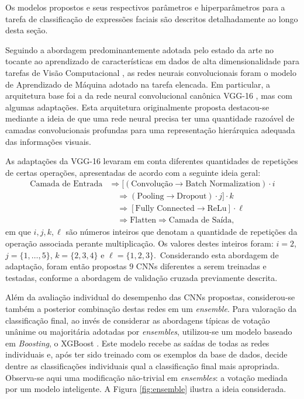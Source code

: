 Os modelos propostos e seus respectivos parâmetros e hiperparâmetros para a tarefa de classificação de expressões faciais são descritos detalhadamente ao longo desta seção.

Seguindo a abordagem predominantemente adotada pelo estado da arte no tocante ao aprendizado de características em dados de alta dimensionalidade para tarefas de Visão Computacional \cite{Khan:Livro}, as redes neurais convolucionais foram o modelo de Aprendizado de Máquina adotado na tarefa elencada. Em particular, a arquitetura base foi a da rede neural convolucional canônica VGG-16 \cite{VGG}, mas com algumas adaptações. Esta arquitetura originalmente proposta  destacou-se mediante a ideia de que uma rede neural precisa ter uma quantidade razoável  de camadas convolucionais profundas para uma representação hierárquica adequada das informações visuais.

As adaptações da VGG-16 levaram em conta diferentes quantidades de repetições de certas operações, apresentadas de acordo com a seguinte ideia geral:
\begin{equation}
\begin{split}
\textrm{Camada de Entrada} & \Rightarrow [ (\textrm{Convolução} \rightarrow \textrm{Batch Normalization})\cdot i\\
 &\quad \Rightarrow (\textrm{Pooling} \rightarrow \textrm{Dropout})\cdot j]\cdot k \\
 &\quad \Rightarrow [\textrm{Fully Connected} \rightarrow \textrm{ReLu}]\cdot \ell \\
 &\quad \Rightarrow \textrm{Flatten} \Rightarrow \textrm{Camada de Saída},
\end{split}
\end{equation} em que $i, j, k, \ell$ são números inteiros que denotam a quantidade de repetições da operação associada perante multiplicação. Os valores destes inteiros foram: $i = 2$, $j = \{1, \ldots, 5\}$, $k = \{2, 3, 4\}$ e $\ell = \{ 1,2,3 \}$.\ Considerando esta abordagem de adaptação, foram então propostas $9$ CNNs diferentes a serem treinadas e testadas, conforme a abordagem de validação cruzada previamente descrita.


Além da avaliação individual do desempenho das CNNs propostas, considerou-se também a posterior combinação destas redes em um \emph{ensemble}. Para valoração da classificação final, ao invés de considerar as abordagens típicas de votação unânime ou majoritária adotadas por \emph{ensembles}, utilizou-se um modelo baseado em \emph{Boosting}, o XGBoost \cite{Chen:Boosting}. Este modelo recebe as saídas de todas as redes individuais e, após ter sido treinado com os exemplos da base de dados, decide dentre as classificações individuais qual a classificação final mais apropriada. Observa-se aqui uma modificação não-trivial em \emph{ensembles}: a votação mediada por um modelo inteligente. A Figura \ref{fig:ensemble} ilustra a ideia considerada.

